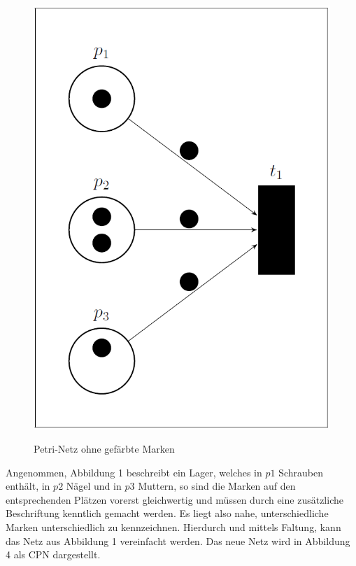 \documentclass[11pt,onecolumn,a4paper,DIV=calc]{scrartcl}
\begin{document}
\begin{figure}[h]
\center
\includegraphics[scale=0.4]{netz1.PNG} \\
\caption{Petri-Netz ohne gefärbte Marken}
\end{figure}
Angenommen, Abbildung 1 beschreibt ein Lager, welches in $p1$ Schrauben enthält, in $p2$ Nägel und in $p3$ Muttern, so sind die Marken auf den entsprechenden Plätzen vorerst gleichwertig und müssen durch eine zusätzliche Beschriftung kenntlich gemacht werden. Es liegt also nahe, unterschiedliche Marken unterschiedlich zu kennzeichnen. Hierdurch und mittels Faltung, kann das Netz aus Abbildung 1 vereinfacht werden. Das neue Netz wird in Abbildung 4 als CPN dargestellt.\\
\end{document}
